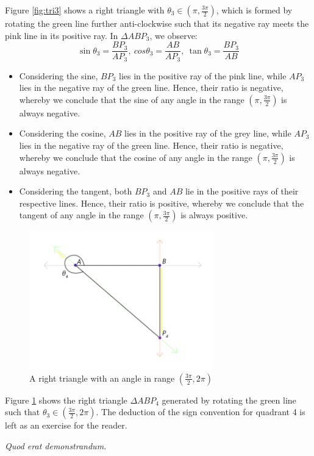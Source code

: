 \documentclass{article}
\begin{document}
Figure \ref{fig:tri3} shows a right triangle with $\theta_3\in(\pi,\frac{3\pi}{2})$, which is formed by rotating the green line further anti-clockwise such that its negative ray meets the pink line in its positive ray. In $\Delta ABP_3$, we observe:
$$\sin\theta_3=\frac{BP_3}{AP_3},\ cos\theta_3=\frac{AB}{AP_3},\ \tan\theta_3=\frac{BP_3}{AB}$$
\begin{itemize}
    \item Considering the sine, $BP_3$ lies in the positive ray of the pink line, while $AP_3$ lies in the negative ray of the green line. Hence, their ratio is negative, whereby we conclude that the sine of any angle in the range $(\pi,\frac{3\pi}{2})$ is always negative.
    \item Considering the cosine, $AB$ lies in the positive ray of the grey line, while $AP_3$ lies in the negative ray of the green line. Hence, their ratio is negative, whereby we conclude that the cosine of any angle in the range $(\pi,\frac{3\pi}{2})$ is always negative.
    \item Considering the tangent, both $BP_3$ and $AB$ lie in the positive rays of their respective lines. Hence, their ratio is positive, whereby we conclude that the tangent of any angle in the range $(\pi,\frac{3\pi}{2})$ is always positive.
\end{itemize}

\begin{figure}[!h]
    \centering
    \includegraphics[width=8cm]{triangle4}
    \caption{A right triangle with an angle in range $(\frac{3\pi}{2},2\pi)$}
    \label{fig:tri4}
\end{figure}

Figure \ref{fig:tri4} shows the right triangle $\Delta ABP_4$ generated by rotating the green line such that $\theta_3\in(\frac{3\pi}{2},2\pi)$. The deduction of the sign convention for quadrant 4 is left as an exercise for the reader.

\emph{Quod erat demonstrandum.}
\end{document}
